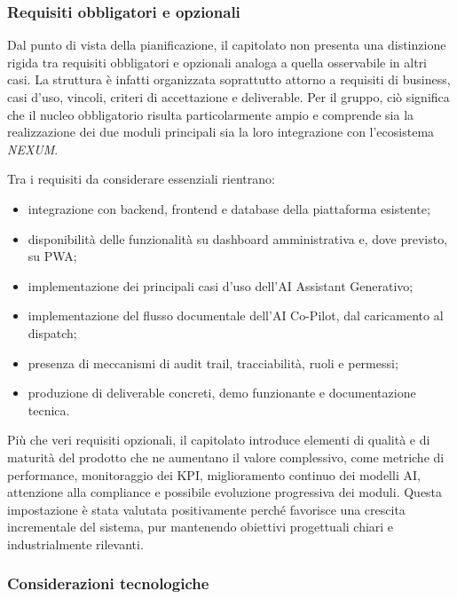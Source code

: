 \documentclass[a4paper,12pt]{article}
\begin{document}
\subsubsection{Requisiti obbligatori e opzionali}

Dal punto di vista della pianificazione, il capitolato non presenta una distinzione rigida tra requisiti obbligatori e opzionali analoga a quella osservabile in altri casi. La struttura è infatti organizzata soprattutto attorno a requisiti di business, casi d'uso, vincoli, criteri di accettazione e deliverable. Per il gruppo, ciò significa che il nucleo obbligatorio risulta particolarmente ampio e comprende sia la realizzazione dei due moduli principali sia la loro integrazione con l'ecosistema \textit{NEXUM}.

Tra i requisiti da considerare essenziali rientrano:

\begin{itemize}
    \item integrazione con backend, frontend e database della piattaforma esistente;
    \item disponibilità delle funzionalità su dashboard amministrativa e, dove previsto, su PWA;
    \item implementazione dei principali casi d'uso dell'AI Assistant Generativo;
    \item implementazione del flusso documentale dell'AI Co-Pilot, dal caricamento al dispatch;
    \item presenza di meccanismi di audit trail, tracciabilità, ruoli e permessi;
    \item produzione di deliverable concreti, demo funzionante e documentazione tecnica.
\end{itemize}

Più che veri requisiti opzionali, il capitolato introduce elementi di qualità e di maturità del prodotto che ne aumentano il valore complessivo, come metriche di performance, monitoraggio dei KPI, miglioramento continuo dei modelli AI, attenzione alla compliance e possibile evoluzione progressiva dei moduli. Questa impostazione è stata valutata positivamente perché favorisce una crescita incrementale del sistema, pur mantenendo obiettivi progettuali chiari e industrialmente rilevanti.

\subsubsection{Considerazioni tecnologiche}
\end{document}
